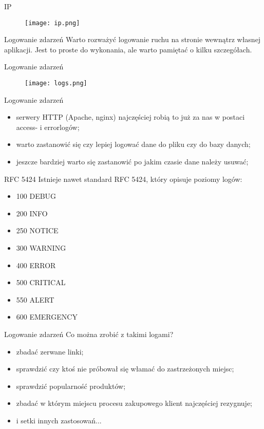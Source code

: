 \begin{frame}{IP}
	\begin{figure}[t]
		\centering
		\texttt{[image: ip.png]}
	\end{figure}
\end{frame}

\begin{frame}{Logowanie zdarzeń}
	Warto rozważyć logowanie ruchu na stronie wewnątrz własnej aplikacji. Jest to proste do wykonania, ale warto pamiętać o kilku szczegółach.
\end{frame}

\begin{frame}{Logowanie zdarzeń}
	\begin{figure}[t]
		\centering
		\texttt{[image: logs.png]}
	\end{figure}
\end{frame}

\begin{frame}{Logowanie zdarzeń}
	\begin{itemize}
	\item serwery HTTP (Apache, nginx) najczęściej robią to już za nas w postaci access- i errorlogów;
	\item warto zastanowić się czy lepiej logować dane do pliku czy do bazy danych;
	\item jeszcze bardziej warto się zastanowić po jakim czasie dane należy usuwać;
	\end{itemize}
\end{frame}

\begin{frame}{RFC 5424}
	Istnieje nawet standard RFC 5424, który opisuje poziomy logów:
	\begin{itemize}
	\item 100 DEBUG
	\item 200 INFO
	\item 250 NOTICE
	\item 300 WARNING
	\item 400 ERROR
	\item 500 CRITICAL
	\item 550 ALERT
	\item 600 EMERGENCY
	\end{itemize}
\end{frame}

\begin{frame}{Logowanie zdarzeń}
	Co można zrobić z takimi logami? 
	\begin{itemize}
	\item zbadać zerwane linki;
	\item sprawdzić czy ktoś nie próbował się włamać do zastrzeżonych miejsc;
	\item sprawdzić popularność produktów;
	\item zbadać w którym miejscu procesu zakupowego klient najczęściej rezygnuje;
	\item i setki innych zastosowań...
	\end{itemize}
\end{frame}

